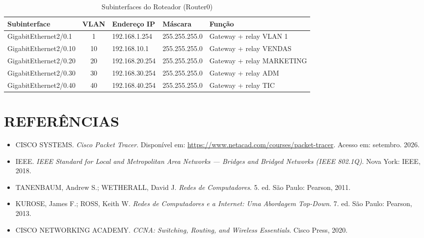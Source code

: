\documentclass[12pt,a4paper]{article}
\begin{document}
\begin{table}[htbp]
\centering
\caption{Subinterfaces do Roteador (Router0)}
\label{tab:subinterfaces}
\small
\begin{tabular}{@{}p{3.8cm}cllp{3.2cm}@{}}
\toprule
\textbf{Subinterface} & \textbf{VLAN} & \textbf{Endereço IP} &
\textbf{Máscara} & \textbf{Função} \\
\midrule
GigabitEthernet2/0.1  & 1  & 192.168.1.254   & 255.255.255.0 & Gateway + relay VLAN 1 \\
GigabitEthernet2/0.10 & 10 & 192.168.10.1    & 255.255.255.0 & Gateway + relay VENDAS \\
GigabitEthernet2/0.20 & 20 & 192.168.20.254  & 255.255.255.0 & Gateway + relay MARKETING \\
GigabitEthernet2/0.30 & 30 & 192.168.30.254  & 255.255.255.0 & Gateway + relay ADM \\
GigabitEthernet2/0.40 & 40 & 192.168.40.254  & 255.255.255.0 & Gateway + relay TIC \\
\bottomrule
\end{tabular}
\end{table}

\clearpage

\section{REFERÊNCIAS}

\begin{itemize}[leftmargin=2em]
  \item CISCO SYSTEMS. \textit{Cisco Packet Tracer}. Disponível em:
        \url{https://www.netacad.com/courses/packet-tracer}. Acesso em: setembro. 2026.

  \item IEEE. \textit{IEEE Standard for Local and Metropolitan Area Networks ---
        Bridges and Bridged Networks (IEEE 802.1Q)}. Nova York: IEEE, 2018.

  \item TANENBAUM, Andrew S.; WETHERALL, David J. \textit{Redes de Computadores}.
        5. ed. São Paulo: Pearson, 2011.

  \item KUROSE, James F.; ROSS, Keith W. \textit{Redes de Computadores e a Internet:
        Uma Abordagem Top-Down}. 7. ed. São Paulo: Pearson, 2013.

  \item CISCO NETWORKING ACADEMY. \textit{CCNA: Switching, Routing, and Wireless
        Essentials}. Cisco Press, 2020.
\end{itemize}
\end{document}
